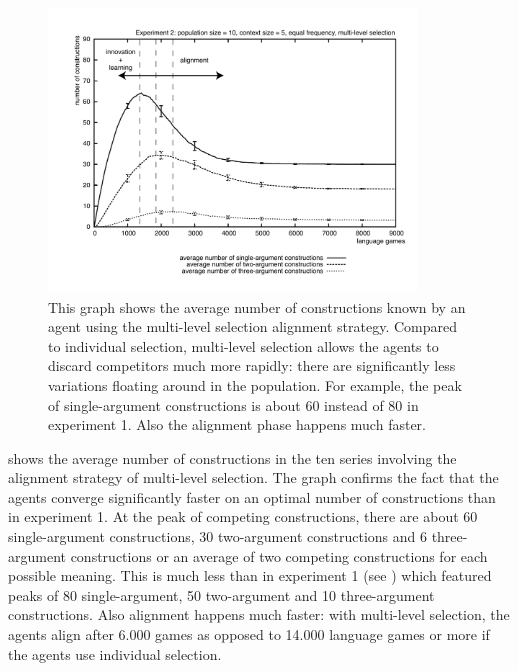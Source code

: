 \begin{figure}[t]
\centerline{\includegraphics[width=0.87\textwidth]{Chapter4/figs/size2d}}
  \caption[Experiment 2: number of constructions with multi-level selection]{This graph shows the average number of constructions known by an agent using the multi-level selection alignment strategy. Compared to individual selection, multi-level selection allows the agents to discard competitors much more rapidly: there are significantly less variations floating around in the population. For example, the peak of single-argument constructions is about 60 instead of 80 in experiment 1. Also the alignment phase happens much faster.}
   \label{f:size2d}
\end{figure}

 shows the average number of constructions in the ten series involving the alignment strategy of multi-level selection. The graph confirms the fact that the agents converge significantly faster on an optimal number of constructions than in experiment 1. At the peak of competing constructions, there are about 60 single-argument constructions, 30 two-argument constructions and 6 three-argument constructions or an average of two competing constructions for each possible meaning. This is much less than in experiment 1 (see ) which featured peaks of 80 single-argument, 50 two-argument and 10 three-argument constructions. Also alignment happens much faster: with multi-level selection, the agents align after 6.000 games as opposed to 14.000 language games or more if the agents use individual selection.

